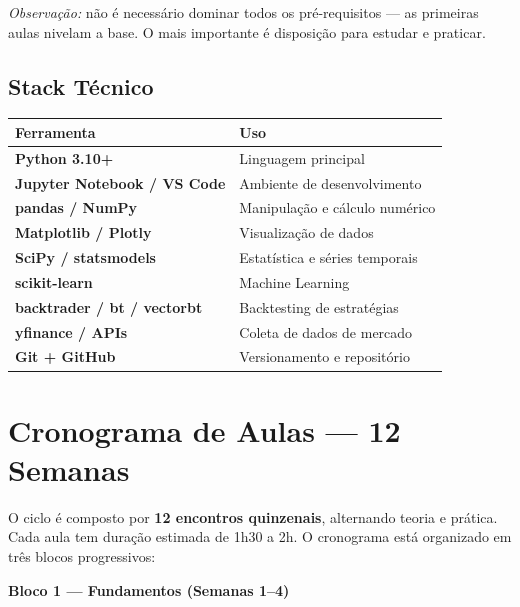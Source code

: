 \documentclass[12pt,a4paper]{article}
\begin{document}
\textit{Observação:} não é necessário dominar todos os pré-requisitos — as primeiras aulas nivelam a base. O mais importante é disposição para estudar e praticar.

\subsection{Stack Técnico}
\begin{center}
\renewcommand{\arraystretch}{1.4}
\begin{tabular}{l l}
    \toprule
    \textbf{Ferramenta} & \textbf{Uso} \\
    \midrule
    \textbf{Python 3.10+} & Linguagem principal \\
    \textbf{Jupyter Notebook / VS Code} & Ambiente de desenvolvimento \\
    \textbf{pandas / NumPy} & Manipulação e cálculo numérico \\
    \textbf{Matplotlib / Plotly} & Visualização de dados \\
    \textbf{SciPy / statsmodels} & Estatística e séries temporais \\
    \textbf{scikit-learn} & Machine Learning \\
    \textbf{backtrader / bt / vectorbt} & Backtesting de estratégias \\
    \textbf{yfinance / APIs} & Coleta de dados de mercado \\
    \textbf{Git + GitHub} & Versionamento e repositório \\
    \bottomrule
\end{tabular}
\end{center}

\section{Cronograma de Aulas — 12 Semanas}

O ciclo é composto por \textbf{12 encontros quinzenais}, alternando teoria e prática. Cada aula tem duração estimada de 1h30 a 2h. O cronograma está organizado em três blocos progressivos:

\vspace{0.3cm}

\noindent
\textbf{\textcolor{ufuazul}{ Bloco 1 — Fundamentos (Semanas 1--4)}}
\end{document}

